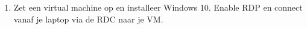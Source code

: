\begin{enumerate}
\item Zet een virtual machine op en installeer Windows 10. Enable RDP en connect vanaf je laptop via de RDC naar je VM.
\end{enumerate}
